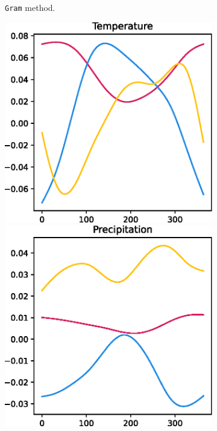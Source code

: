 \begin{figure}
\begin{subfigure}[b]{0.3\textwidth}
    \caption{\texttt{Gram} method.}
    \end{subfigure}
    \hfill
    \begin{subfigure}[b]{0.3\textwidth}
    \centering
    \includegraphics[width=\textwidth]{eigen_temp_cov.eps}
    \includegraphics[width=\textwidth]{eigen_prec_cov.eps}

\end{subfigure}
\end{figure}
